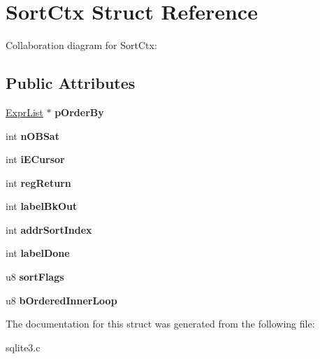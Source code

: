 \hypertarget{structSortCtx}{}\section{Sort\+Ctx Struct Reference}
\label{structSortCtx}


Collaboration diagram for Sort\+Ctx\+:
\subsection*{Public Attributes}
\begin{DoxyCompactItemize}
\item 
\hyperlink{structExprList}{Expr\+List} $\ast$ {\bfseries p\+Order\+By}\hypertarget{structSortCtx_a4c1f59510d6e08b38c958c358d31ba07}{}\label{structSortCtx_a4c1f59510d6e08b38c958c358d31ba07}

\item 
int {\bfseries n\+O\+B\+Sat}\hypertarget{structSortCtx_a32e424bbae6b3e56a0959738eaaaf1d2}{}\label{structSortCtx_a32e424bbae6b3e56a0959738eaaaf1d2}

\item 
int {\bfseries i\+E\+Cursor}\hypertarget{structSortCtx_acaf1633a51ccc836edd0594f90ed501b}{}\label{structSortCtx_acaf1633a51ccc836edd0594f90ed501b}

\item 
int {\bfseries reg\+Return}\hypertarget{structSortCtx_a78017ace0acd29ba15652e389d9f90f6}{}\label{structSortCtx_a78017ace0acd29ba15652e389d9f90f6}

\item 
int {\bfseries label\+Bk\+Out}\hypertarget{structSortCtx_abc19dcb503656023d5596aa31378e973}{}\label{structSortCtx_abc19dcb503656023d5596aa31378e973}

\item 
int {\bfseries addr\+Sort\+Index}\hypertarget{structSortCtx_ad4c264de37b3f3b9bbff55e34659ef11}{}\label{structSortCtx_ad4c264de37b3f3b9bbff55e34659ef11}

\item 
int {\bfseries label\+Done}\hypertarget{structSortCtx_a0f08fc3dd9df4320b3bb74461ca46759}{}\label{structSortCtx_a0f08fc3dd9df4320b3bb74461ca46759}

\item 
u8 {\bfseries sort\+Flags}\hypertarget{structSortCtx_aca4654bd8cf3789c3a1b05d144e3ce2c}{}\label{structSortCtx_aca4654bd8cf3789c3a1b05d144e3ce2c}

\item 
u8 {\bfseries b\+Ordered\+Inner\+Loop}\hypertarget{structSortCtx_a193c1104dbc3f5bfef3bd1f5ae1ada03}{}\label{structSortCtx_a193c1104dbc3f5bfef3bd1f5ae1ada03}

\end{DoxyCompactItemize}


The documentation for this struct was generated from the following file\+:\begin{DoxyCompactItemize}
\item 
sqlite3.\+c\end{DoxyCompactItemize}
